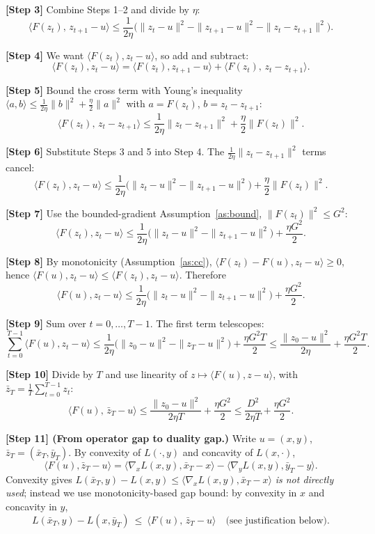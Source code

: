 \documentclass[11pt]{article}
\begin{document}
\medskip
\noindent\textbf{[Step 3]} Combine Steps 1--2 and divide by $\eta$:
\[
\langle F(z_t),\, z_{t+1}-u\rangle
\le \frac{1}{2\eta}\Big(\|z_t-u\|^2 - \|z_{t+1}-u\|^2 - \|z_t-z_{t+1}\|^2\Big).
\]

\medskip
\noindent\textbf{[Step 4]} We want $\langle F(z_t), z_t-u\rangle$, so add and subtract:
\[
\langle F(z_t), z_t - u\rangle
= \langle F(z_t), z_{t+1}-u\rangle + \langle F(z_t),\, z_t - z_{t+1}\rangle.
\]

\medskip
\noindent\textbf{[Step 5]} Bound the cross term with Young's inequality
$\langle a,b\rangle \le \frac{1}{2\eta}\|b\|^2 + \frac{\eta}{2}\|a\|^2$ with
$a=F(z_t)$, $b=z_t-z_{t+1}$:
\[
\langle F(z_t),\, z_t - z_{t+1}\rangle
\le \frac{1}{2\eta}\|z_t - z_{t+1}\|^2 + \frac{\eta}{2}\|F(z_t)\|^2.
\]

\medskip
\noindent\textbf{[Step 6]} Substitute Steps 3 and 5 into Step 4. The
$\frac{1}{2\eta}\|z_t-z_{t+1}\|^2$ terms cancel:
\[
\langle F(z_t), z_t - u\rangle
\le \frac{1}{2\eta}\Big(\|z_t-u\|^2 - \|z_{t+1}-u\|^2\Big) + \frac{\eta}{2}\|F(z_t)\|^2.
\]

\medskip
\noindent\textbf{[Step 7]} Use the bounded-gradient Assumption~\ref{as:bound},
$\|F(z_t)\|^2 \le G^2$:
\[
\langle F(z_t), z_t - u\rangle
\le \frac{1}{2\eta}\Big(\|z_t-u\|^2 - \|z_{t+1}-u\|^2\Big) + \frac{\eta G^2}{2}.
\]

\medskip
\noindent\textbf{[Step 8]} By monotonicity (Assumption~\ref{as:cc}),
$\langle F(z_t)-F(u), z_t-u\rangle\ge0$, hence
$\langle F(u), z_t-u\rangle \le \langle F(z_t), z_t-u\rangle$. Therefore
\[
\langle F(u), z_t - u\rangle
\le \frac{1}{2\eta}\Big(\|z_t-u\|^2 - \|z_{t+1}-u\|^2\Big) + \frac{\eta G^2}{2}.
\]

\medskip
\noindent\textbf{[Step 9]} Sum over $t=0,\dots,T-1$. The first term telescopes:
\[
\sum_{t=0}^{T-1}\langle F(u), z_t - u\rangle
\le \frac{1}{2\eta}\Big(\|z_0-u\|^2 - \|z_T-u\|^2\Big) + \frac{\eta G^2 T}{2}
\le \frac{\|z_0-u\|^2}{2\eta} + \frac{\eta G^2 T}{2}.
\]

\medskip
\noindent\textbf{[Step 10]} Divide by $T$ and use linearity of
$z\mapsto\langle F(u),z-u\rangle$, with $\bar z_T = \frac1T\sum_{t=0}^{T-1} z_t$:
\[
\langle F(u),\, \bar z_T - u\rangle
\le \frac{\|z_0-u\|^2}{2\eta T} + \frac{\eta G^2}{2}
\le \frac{D^2}{2\eta T} + \frac{\eta G^2}{2}.
\]

\medskip
\noindent\textbf{[Step 11] (From operator gap to duality gap.)}
Write $u=(x,y)$, $\bar z_T=(\bar x_T,\bar y_T)$. By convexity of
$L(\cdot,y)$ and concavity of $L(x,\cdot)$,
\[
\langle F(u), \bar z_T - u\rangle
= \langle \nabla_x L(x,y), \bar x_T - x\rangle - \langle \nabla_y L(x,y), \bar y_T - y\rangle.
\]
Convexity gives $L(\bar x_T,y) - L(x,y) \le \langle \nabla_x L(x,y),\bar x_T - x\rangle$
\emph{is not directly used}; instead we use monotonicity-based gap bound:
by convexity in $x$ and concavity in $y$,
\[
L(\bar x_T, y) - L(x, \bar y_T)\ \le\ \langle F(u),\, \bar z_T - u\rangle
\quad\text{(see justification below).}
\]
\end{document}
